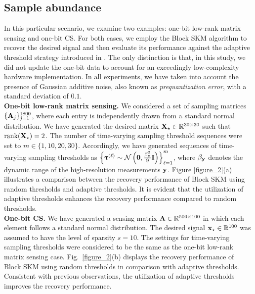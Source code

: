 \documentclass[12pt,draftcls,onecolumn]{IEEEtran}
\makeatletter
\newcommand*{\rom}[1]{\expandafter\@slowromancap\romannumeral #1@}
\makeatother
\begin{document}
\subsection{Sample abundance}
In this particular scenario, we examine two examples: one-bit low-rank matrix sensing and one-bit CS. For both cases, we employ the Block SKM algorithm to recover the desired signal and then evaluate its performance against the adaptive threshold strategy introduced in \cite[Section~\rom{6}]{eamaz2022phase}. The only distinction is that, in this study, we did not update the one-bit data to account for an exceedingly low-complexity hardware implementation.
In all experiments, we have taken into account the presence of Gaussian additive noise, also known as \emph{prequantization error}, with a standard deviation of $0.1$.
\\
\textbf{One-bit low-rank matrix sensing.} We considered a set of sampling matrices $\{\mathbf{A}_j\}_{j=1}^{1800}$, where each entry is independently drawn from a standard normal distribution. We have generated the desired matrix $\mathbf{X}_{\star}\in\mathbb{R}^{30\times 30}$ such that $\operatorname{rank}(\mathbf{X}_{\star})=2$. The number of time-varying sampling threshold sequences were set to $m\in\{1,10,20,30\}$. Accordingly, we have generated sequences of time-varying sampling thresholds as $\left\{\boldsymbol{\uptau}^{(\ell)}\sim \mathcal{N}\left(\mathbf{0},\frac{\beta_{\mathbf{y}}^2}{9}\mathbf{I}\right)\right\}_{\ell=1}^{m}$, where $\beta_{\mathbf{y}}$ denotes the dynamic range of the high-resolution measurements $\mathbf{y}$. Figure \ref{figure_2}(a) illustrates a comparison between the recovery performance of Block SKM using random thresholds and %
adaptive thresholds. It is evident that the utilization of adaptive thresholds enhances the recovery performance compared to random thresholds.
\\
\textbf{One-bit CS.} We have generated a sensing matrix $\mathbf{A}\in\mathbb{R}^{500\times 100}$ in which each element follows a standard normal distribution. The desired signal $\mathbf{x}_{\star}\in\mathbb{R}^{100}$ was assumed to have the level of sparsity $s=10$. The settings for time-varying sampling thresholds were considered to be the same as the one-bit low-rank matrix sensing case. Fig.~\ref{figure_2}(b) displays the recovery performance of Block SKM using random thresholds in comparison with adaptive thresholds. Consistent with previous observations, the utilization of adaptive thresholds improves the recovery performance.
\end{document}
